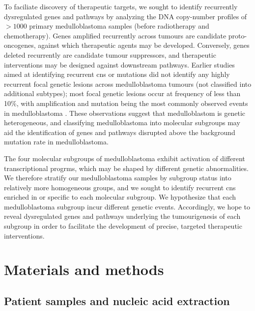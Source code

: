 To faciliate discovery of therapeutic targets, we sought to identify recurrently dysregulated genes and pathways by analyzing the DNA copy-number profiles of $> 1000$ primary medulloblastoma samples (before radiotherapy and chemotherapy). Genes amplified recurrently across tumours are candidate proto-oncogenes, against which therapeutic agents may be developed. Conversely, genes deleted recurrently are candidate tumour suppressors, and therapeutic interventions may be designed against downstream pathways. Earlier studies aimed at identifying recurrent \gls{cns} or mutations did not identify any highly recurrent focal genetic lesions across medulloblastoma tumours (not classified into additional subtypes); most focal genetic lesions occur at frequency of less than 10\%, with  amplification and  mutation being the most commonly observed events in medulloblastoma . These observations suggest that medulloblastom is genetic heterogeneous, and classifying medulloblastoma into molecular subgroups may aid the identification of genes and pathways disrupted above the background mutation rate in medulloblastoma.

The four molecular subgroups of medulloblastoma exhibit activation of different transcriptional progrms, which may be shaped by different genetic abnormalities. We therefore stratify our medulloblastoma samples by subgroup status into relatively more homogeneous groups, and we sought to identify recurrent \gls{cns} enriched in or specific to each molecular subgroup. We hypothesize that each medulloblastoma subgroup incur different genetic events. Accordingly, we hope to reveal dysregulated genes and pathways underlying the tumourigenesis of each subgroup in order to facilitate the development of precise, targeted therapeutic interventions.



\clearpage

\section{Materials and methods}

\subsection{Patient samples and nucleic acid extraction}


